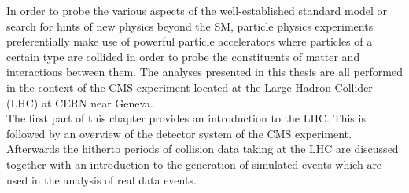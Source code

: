 In order to probe the various aspects of the well-established standard model or search for hints of new physics beyond the SM, particle physics experiments preferentially make use of powerful particle accelerators where particles of a certain type are collided in order to probe the constituents of matter and interactions between them. The analyses presented in this thesis are all performed in the context of the CMS experiment located at the Large Hadron Collider (LHC) at CERN near Geneva. \\ 
The first part of this chapter provides an introduction to the LHC. This is followed by an overview of the detector system of the CMS experiment. Afterwards the hitherto periods of collision data taking at the LHC are discussed together with an introduction to the generation of simulated events which are used in the analysis of real data events.  
